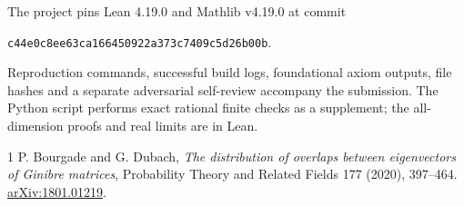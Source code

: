 \documentclass[11pt]{article}
\begin{document}
The project pins Lean 4.19.0 and Mathlib v4.19.0 at commit
\begin{center}\small\texttt{c44e0c8ee63ca166450922a373c7409c5d26b00b}.\end{center}
Reproduction commands, successful build logs, foundational axiom outputs,
file hashes and a separate adversarial self-review accompany the submission.
The Python script performs exact rational finite checks as a supplement;
the all-dimension proofs and real limits are in Lean.

\begin{thebibliography}{1}
 P. Bourgade and G. Dubach,
\emph{The distribution of overlaps between eigenvectors of Ginibre matrices},
Probability Theory and Related Fields 177 (2020), 397--464.
\href{https://arxiv.org/abs/1801.01219}{arXiv:1801.01219}.
\end{thebibliography}
\end{document}
